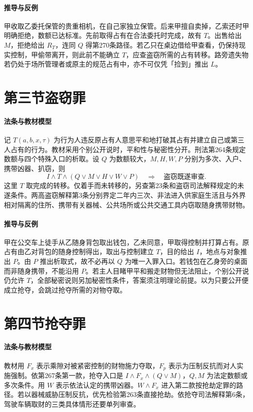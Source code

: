 \paragraph{推导与反例}
甲收取乙委托保管的贵重相机，在自己家独立保管。后来甲擅自卖掉，乙索还时甲明确拒绝，数额已达标准。先前取得占有在合法委托时完成，故有 $T$。出售给出 $M$，拒绝给出 $R_T$，连同 $Q$ 得第270条路径。若乙只在桌边借给甲查看，仍保持现实控制，甲偷带离开，则此前不能确立 $T$，应查盗窃所需的占有转移。路旁遗失物若仍处于场所管理者或原主的规范占有中，亦不可仅凭「捡到」推出 $L$。

\section{第三节\quad 盗窃罪}

\paragraph{法条与教材模型}
记 $T(a,b,x,\tau)$ 为行为人违反原占有人意思平和地打破其占有并建立自己或第三人占有的行为。教材采用个别公开说时，平和性与秘密性分开。刑法第264条规定数额与四个特殊入口的析取。设 $Q$ 为数额较大，$M,H,W,P$ 分别为多次、入户、携带凶器、扒窃，则
\[
 I\land T\land(Q\lor M\lor H\lor W\lor P)
 \quad\Longrightarrow\quad \text{盗窃既遂审查}.
\]
这里 $T$ 取完成的转移。仅着手而未转移的，另查第23条和盗窃司法解释规定的未遂条件。两高盗窃解释第3条分别界定二年内三次、非法进入供家庭生活且与外界相对隔离的住所、携带有关器械、公共场所或公共交通工具内窃取随身携带财物。

\paragraph{推导与反例}
甲在公交车上徒手从乙随身背包取出钱包，乙未同意，甲取得控制并打算占有。原占有由乙对背包的随身控制得出，取出与控制建立 $T$，目的给出 $I$，地点与对象推出 $P$。由 $P$ 推出析取式，故不必再以 $Q$ 为唯一入罪入口。若钱包在乙身旁的桌面而非随身携带，不能沿用 $P$。若主人目睹甲平和搬走财物但无法阻止，个别公开说仍允许 $T$，全部秘密说则另加秘密性条件，答案须注明理论前提。以为只要公开便成立抢夺，会跳过抢夺所需的对物夺取。

\section{第四节\quad 抢夺罪}

\paragraph{法条与教材模型}
教材用 $F_x$ 表示乘隙对被紧密控制的财物施力夺取，$F_p$ 表示为压制反抗而对人实施强制。依第267条第一款，抢夺入口是 $I\land F_x\land(Q\lor M)$，$Q,M$ 为法定数额或多次条件。用 $W$ 表示依法认定的携带凶器。$W\land F_x$ 进入第二款按抢劫定罪的路径。若以器械威胁压制反抗，优先检验第263条直接抢劫。依抢夺司法解释第6条，驾驶车辆取财的三类具体情形还要单列审查。


